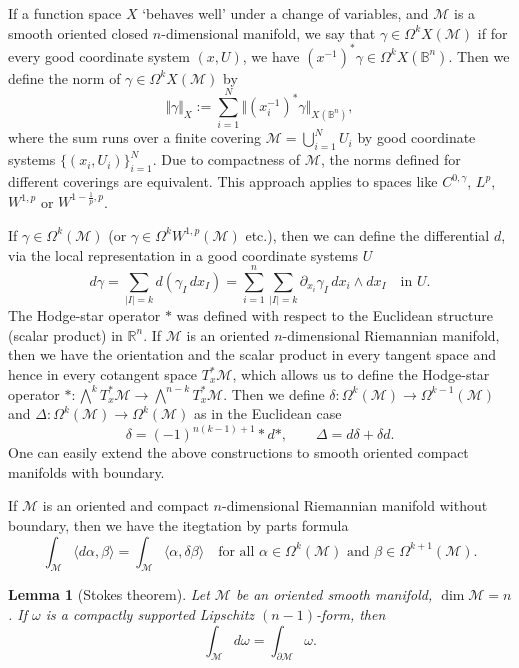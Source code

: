 \documentclass[intlimits,12pt,reqno]{amsart}
\newcommand{\cM}{\mathcal M}
\newcommand{\bbbb}{\mathbb B}
\newcommand{\R}{\mathbb R}
\numberwithin{equation}{section}
\newtheorem{lemma}[theorem]{Lemma}
\theoremstyle{definition}
\newcommand{\Ep}{\bigwedge\nolimits}
\newcommand{\brac}[1]{\left ( #1 \right )}
\newcommand{\lap}{\Delta}
\begin{document}
If a function space $X$ `behaves well' under a change of variables, and $\cM$ is a smooth oriented closed $n$-dimensional manifold,
we say that $\gamma\in \Omega^k X(\cM)$ if for every good coordinate system $(x,U)$, 
we have $(x^{-1})^*\gamma\in\Omega^kX(\bbbb^n)$.
Then we define the norm of 
$\gamma\in \Omega^k X(\cM)$ by
\begin{equation}
\label{eq38}
\Vert\gamma\Vert_X:=\sum_{i=1}^N \Vert (x^{-1}_{i})^*\gamma \Vert_{X(\bbbb^n)},
\end{equation}
where the sum runs over a finite covering $\cM=\bigcup_{i=1}^N U_i$ by
good coordinate systems $\{ (x_i,U_i)\}_{i=1}^N$.
Due to compactness of $\cM$, the norms defined for different coverings are equivalent. 
This approach applies to spaces like $C^{0,\gamma}$, $L^p$, $W^{1,p}$ or $W^{1-\frac{1}{p},p}$.



If $\gamma \in \Omega^k(\cM)$ (or $\gamma\in\Omega^kW^{1,p}(\cM)$ etc.), then we can define the differential $d$, via the local representation in a good coordinate systems $U$
\[
d\gamma =\sum_{|I|=k} d\brac{\gamma_I\, dx_I} = \sum_{i=1}^n \sum_{|I|=k} \partial_{x_i} \gamma_I\, dx_i \wedge dx_I \quad \text{in $U$.}
\]
The Hodge-star operator $\ast$ was defined with respect to the Euclidean structure (scalar product) in $\R^n$. If $\cM$ is an oriented $n$-dimensional Riemannian manifold, then we have the orientation and the scalar product in every tangent space and hence in every cotangent space $T_x^*\cM$, which allows us to define the Hodge-star operator $\ast:\Ep^kT_x^*\cM\to \Ep^{n-k}T_x^*\cM$. Then we define $\delta: \Omega^k(\cM) \to \Omega^{k-1}(\cM)$ and $\lap: \Omega^k(\cM) \to \Omega^k(\cM)$ as in the Euclidean case 
$$
\delta = (-1)^{n(k-1)+1}\ast d \ast,
\qquad
 \lap = d \delta + \delta d.
$$
One can easily extend the above constructions to smooth oriented compact manifolds with boundary.

If $\cM$ is an oriented and compact $n$-dimensional Riemannian manifold without boundary, then we have the itegtation by parts formula
\begin{equation}
\label{eq137}
\int_\cM\langle d\alpha,\beta\rangle=\int_\cM\langle\alpha,\delta\beta\rangle
\quad
\text{for all $\alpha\in \Omega^k(\cM)$ and $\beta\in\Omega^{k+1}(\cM)$}.
\end{equation}

\begin{lemma}[Stokes theorem]
\label{T78}
Let $\cM$ be an oriented smooth manifold, $\dim\cM=n$. If $\omega$ is a compactly supported Lipschitz $(n-1)$-form, then
$$
\int_{\cM}d\omega=\int_{\partial\cM}\omega.
$$
\end{lemma}
\end{document}
